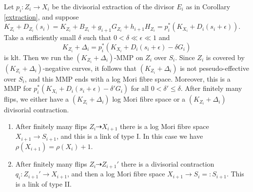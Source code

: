 \documentclass[11pt]{amsart}
\begin{document}
\begin{enumerate}
    Let $p_{i}:Z_{i}\to X_{i}$ be the divisorial extraction of the divisor $E_{i}$ as in Corollary \ref{extraction}, and suppose $K_{Z_{i}}+D_{Z_{i}}(s_{i})=K_{Z_{i}}+B_{Z_{i}}+g_{i+1}G_{Z_{i}}+h_{i+1}H_{Z_{i}}=p_{i}^*\left(K_{X_{i}}+D_{i}\left(s_{i}+\epsilon\right)\right)$.
   Take a sufficiently small $\delta$ such that $0<\delta \ll \epsilon \ll 1$ and
   \[
     K_{Z_{i}}+\Delta_{i}=p_{i}^*(K_{X_{i}}+D_{i}(s_{i}+\epsilon)-\delta G_{i})
   \]
  is klt. Then we run the $(K_{Z_{i}}+\Delta_{i})$-MMP on $Z_{i}$ over $S_{i}$. Since $Z_{i}$ is covered by $(K_{Z_{i}}+\Delta_{i})$-negative curves, it follows that $(K_{Z_{i}}+\Delta_{i})$ is not peseudo-effective over $S_{i}$, and  this MMP ends with a log Mori fibre space. Moreover, this is a MMP for $p_{i}^*(K_{X_{i}}+D_{i}(s_{i}+\epsilon)-\delta'G_{i})$ for all $0<\delta'\leqslant\delta$. After finitely many flips, we either have a $(K_{Z_{i}}+\Delta_{i})$ log Mori fibre space or a $(K_{Z_{i}}+\Delta_{i})$ divisorial contraction.
  \begin{enumerate}
    \item\label{2b1} After finitely many flips $Z_{i}\dashrightarrow X_{i+1}$ there is a log Mori fibre space $X_{i+1}\to S_{i+1}$, and this is a link of type I. In this case we have $\rho(X_{i+1})=\rho(X_{i})+1$.
    \item\label{2b2} After finitely many flips $Z_{i}\dashrightarrow Z_{i+1}'$ there is a divisorial contraction $q_{i}:Z_{i+1}'\to X_{i+1}$, and then a log Mori fibre space $X_{i+1}\to S_{i}=:S_{i+1}$. This is a link of type II.
  \end{enumerate}
\end{enumerate}
\end{document}
